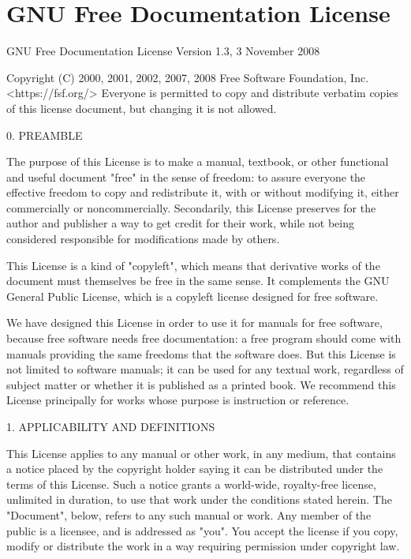\documentclass[11pt]{article}
\begin{document}
\section{GNU Free Documentation License}

                GNU Free Documentation License
                 Version 1.3, 3 November 2008


 Copyright (C) 2000, 2001, 2002, 2007, 2008 Free Software Foundation, Inc.
     <https://fsf.org/>
 Everyone is permitted to copy and distribute verbatim copies
 of this license document, but changing it is not allowed.

0. PREAMBLE

The purpose of this License is to make a manual, textbook, or other
functional and useful document "free" in the sense of freedom: to
assure everyone the effective freedom to copy and redistribute it,
with or without modifying it, either commercially or noncommercially.
Secondarily, this License preserves for the author and publisher a way
to get credit for their work, while not being considered responsible
for modifications made by others.

This License is a kind of "copyleft", which means that derivative
works of the document must themselves be free in the same sense.  It
complements the GNU General Public License, which is a copyleft
license designed for free software.

We have designed this License in order to use it for manuals for free
software, because free software needs free documentation: a free
program should come with manuals providing the same freedoms that the
software does.  But this License is not limited to software manuals;
it can be used for any textual work, regardless of subject matter or
whether it is published as a printed book.  We recommend this License
principally for works whose purpose is instruction or reference.


1. APPLICABILITY AND DEFINITIONS

This License applies to any manual or other work, in any medium, that
contains a notice placed by the copyright holder saying it can be
distributed under the terms of this License.  Such a notice grants a
world-wide, royalty-free license, unlimited in duration, to use that
work under the conditions stated herein.  The "Document", below,
refers to any such manual or work.  Any member of the public is a
licensee, and is addressed as "you".  You accept the license if you
copy, modify or distribute the work in a way requiring permission
under copyright law.
\end{document}
